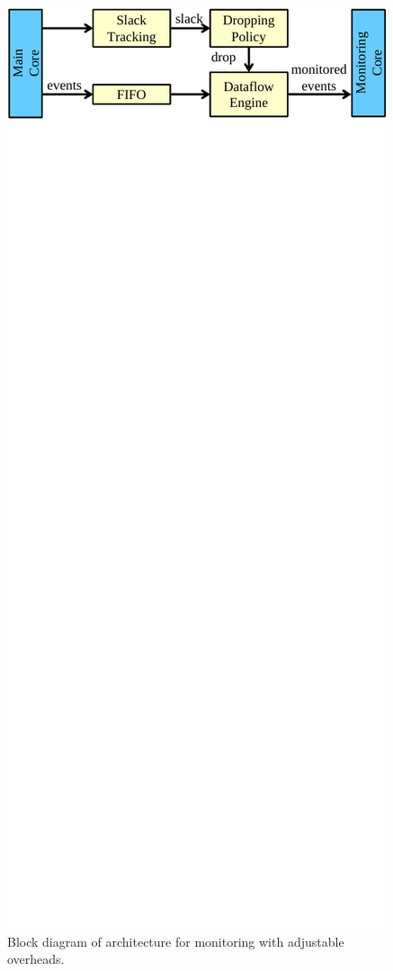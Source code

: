 \begin{figure}
  \begin{center}
    \includegraphics[width=\columnwidth]{figs/drop_overview.pdf}
    \vspace{-0.3in}
    \caption{Block diagram of architecture for monitoring with adjustable overheads.}
    \label{fig:drop.overview}
    \vspace{-0.1in}
  \end{center}
\end{figure}

